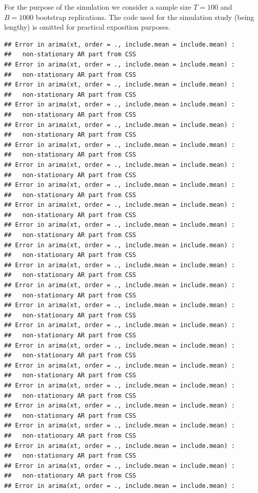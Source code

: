 \documentclass[]{book}
\theoremstyle{definition}
\theoremstyle{definition}
\theoremstyle{definition}
\theoremstyle{remark}
\begin{document}
For the purpose of the simulation we consider a sample size \(T = 100\)
and \(B = 1000\) bootstrap replications. The code used for the
simulation study (being lengthy) is omitted for practical exposition
purposes.

\begin{verbatim}
## Error in arima(xt, order = ., include.mean = include.mean) : 
##   non-stationary AR part from CSS
## Error in arima(xt, order = ., include.mean = include.mean) : 
##   non-stationary AR part from CSS
## Error in arima(xt, order = ., include.mean = include.mean) : 
##   non-stationary AR part from CSS
## Error in arima(xt, order = ., include.mean = include.mean) : 
##   non-stationary AR part from CSS
## Error in arima(xt, order = ., include.mean = include.mean) : 
##   non-stationary AR part from CSS
## Error in arima(xt, order = ., include.mean = include.mean) : 
##   non-stationary AR part from CSS
## Error in arima(xt, order = ., include.mean = include.mean) : 
##   non-stationary AR part from CSS
## Error in arima(xt, order = ., include.mean = include.mean) : 
##   non-stationary AR part from CSS
## Error in arima(xt, order = ., include.mean = include.mean) : 
##   non-stationary AR part from CSS
## Error in arima(xt, order = ., include.mean = include.mean) : 
##   non-stationary AR part from CSS
## Error in arima(xt, order = ., include.mean = include.mean) : 
##   non-stationary AR part from CSS
## Error in arima(xt, order = ., include.mean = include.mean) : 
##   non-stationary AR part from CSS
## Error in arima(xt, order = ., include.mean = include.mean) : 
##   non-stationary AR part from CSS
## Error in arima(xt, order = ., include.mean = include.mean) : 
##   non-stationary AR part from CSS
## Error in arima(xt, order = ., include.mean = include.mean) : 
##   non-stationary AR part from CSS
## Error in arima(xt, order = ., include.mean = include.mean) : 
##   non-stationary AR part from CSS
## Error in arima(xt, order = ., include.mean = include.mean) : 
##   non-stationary AR part from CSS
## Error in arima(xt, order = ., include.mean = include.mean) : 
##   non-stationary AR part from CSS
## Error in arima(xt, order = ., include.mean = include.mean) : 
##   non-stationary AR part from CSS
## Error in arima(xt, order = ., include.mean = include.mean) : 
##   non-stationary AR part from CSS
## Error in arima(xt, order = ., include.mean = include.mean) : 
##   non-stationary AR part from CSS
## Error in arima(xt, order = ., include.mean = include.mean) : 
##   non-stationary AR part from CSS
## Error in arima(xt, order = ., include.mean = include.mean) : 

\end{verbatim}
\end{document}
